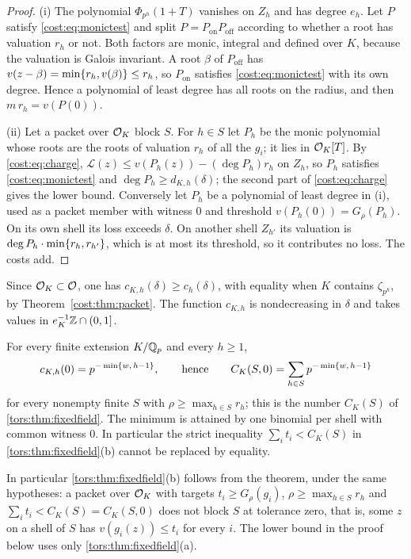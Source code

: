 \begin{proof}
(i) The polynomial $\Phi_{p^h}(1+T)$ vanishes on $Z_h$ and has degree $e_h$. Let $P$ satisfy
\eqref{cost:eq:monictest} and split $P=P_{\mathrm{on}}P_{\mathrm{off}}$ according to
whether a root has valuation $r_h$ or not. Both factors are monic, integral and defined
over $K$, because the valuation is Galois invariant. A root $\beta$ of $P_{\mathrm{off}}$
has $v(z-\beta)=\min\{r_h,v(\beta)\}\le r_h$, so $P_{\mathrm{on}}$ satisfies
\eqref{cost:eq:monictest} with its own degree. Hence a polynomial of least degree has all
roots on the radius, and then $m\,r_h=v(P(0))$.

(ii) Let a packet over $\mathcal{O}_K$ block $S$. For $h\in S$ let $P_h$ be the monic polynomial
whose roots are the roots of valuation $r_h$ of all the $g_i$; it lies in $\mathcal{O}_K[T]$. By
\eqref{cost:eq:charge}, $\mathcal L(z)\le v(P_h(z))-(\deg P_h)r_h$ on $Z_h$, so $P_h$
satisfies \eqref{cost:eq:monictest} and $\deg P_h\ge d_{K,h}(\delta)$; the second part of
\eqref{cost:eq:charge} gives the lower bound. Conversely let $P_h$ be a polynomial of least
degree in (i), used as a packet member with witness $0$ and threshold
$v(P_h(0))=G_\rho(P_h)$. On its own shell its loss exceeds $\delta$. On another shell
$Z_{h'}$ its valuation is $\deg P_h\cdot\min\{r_h,r_{h'}\}$, which is at most its
threshold, so it contributes no loss. The costs add.
\end{proof}

Since $\mathcal{O}_K\subset\mathcal{O}$, one has $c_{K,h}(\delta)\ge c_h(\delta)$, with equality when $K$
contains $\zeta_{p^h}$, by Theorem~\ref{cost:thm:packet}. The function $c_{K,h}$ is nondecreasing
in $\delta$ and takes values in $e_K^{-1}\mathbb{Z}\cap(0,1]$.

\begin{theorem}\label{cost:thm:field}
For every finite extension $K/\mathbb{Q}_p$ and every $h\ge1$,
\[
 c_{K,h}(0)=p^{-\min\{w,\,h-1\}},\qquad\text{hence}\qquad
 C_K(S,0)=\sum_{h\in S}p^{-\min\{w,\,h-1\}}
\]
for every nonempty finite $S$ with $\rho\ge\max_{h\in S}r_h$; this is the number $C_K(S)$
of \cref{tors:thm:fixedfield}. The minimum is attained by one binomial per shell with
common witness $0$. In particular the strict inequality $\sum_it_i<C_K(S)$ in
\cref{tors:thm:fixedfield}\textup{(b)} cannot be replaced by equality.
\end{theorem}

In particular \cref{tors:thm:fixedfield}\textup{(b)} follows from the theorem, under the
same hypotheses: a packet over $\mathcal{O}_K$ with targets $t_i\ge G_\rho(g_i)$, $\rho\ge\max_{h\in
S}r_h$ and $\sum_it_i<C_K(S)=C_K(S,0)$ does not block $S$ at tolerance zero, that is, some
$z$ on a shell of $S$ has $v(g_i(z))\le t_i$ for every $i$. The lower bound in the proof
below uses only \cref{tors:thm:fixedfield}\textup{(a)}.

